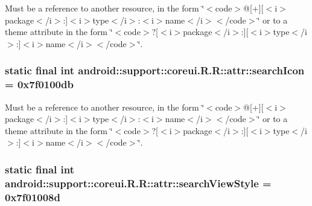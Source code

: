 Must be a reference to another resource, in the form \char`\"{}$<$code$>$@\mbox{[}+\mbox{]}\mbox{[}$<$i$>$package$<$/i$>$:\mbox{]}$<$i$>$type$<$/i$>$:$<$i$>$name$<$/i$>$$<$/code$>$\char`\"{} or to a theme attribute in the form \char`\"{}$<$code$>$?\mbox{[}$<$i$>$package$<$/i$>$:\mbox{]}\mbox{[}$<$i$>$type$<$/i$>$:\mbox{]}$<$i$>$name$<$/i$>$$<$/code$>$\char`\"{}. \hypertarget{classandroid_1_1support_1_1coreui_1_1_r_1_1attr_817360f59338cd34f15b1464a3ebfbd5}{
\subsubsection[{searchIcon}]{\setlength{\rightskip}{0pt plus 5cm}static final int android::support::coreui.R.R::attr::searchIcon = 0x7f0100db}}
\label{classandroid_1_1support_1_1coreui_1_1_r_1_1attr_817360f59338cd34f15b1464a3ebfbd5}


Must be a reference to another resource, in the form \char`\"{}$<$code$>$@\mbox{[}+\mbox{]}\mbox{[}$<$i$>$package$<$/i$>$:\mbox{]}$<$i$>$type$<$/i$>$:$<$i$>$name$<$/i$>$$<$/code$>$\char`\"{} or to a theme attribute in the form \char`\"{}$<$code$>$?\mbox{[}$<$i$>$package$<$/i$>$:\mbox{]}\mbox{[}$<$i$>$type$<$/i$>$:\mbox{]}$<$i$>$name$<$/i$>$$<$/code$>$\char`\"{}. \hypertarget{classandroid_1_1support_1_1coreui_1_1_r_1_1attr_6c97697aa36dd9357fde787f8c208abf}{
\subsubsection[{searchViewStyle}]{\setlength{\rightskip}{0pt plus 5cm}static final int android::support::coreui.R.R::attr::searchViewStyle = 0x7f01008d}}
\label{classandroid_1_1support_1_1coreui_1_1_r_1_1attr_6c97697aa36dd9357fde787f8c208abf}


